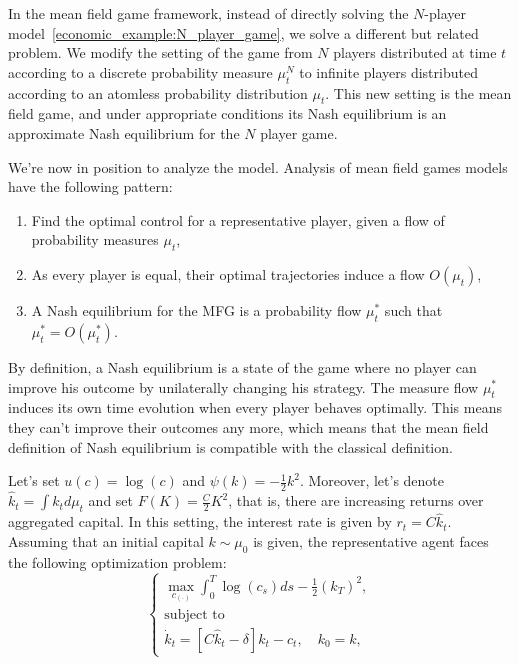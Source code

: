 In the mean field game framework, instead of directly solving the $N$-player model~\eqref{economic_example:N_player_game},
we solve a different but related problem. 
We modify the setting of the game from $N$ players distributed at time $t$ according to a discrete probability measure $\mu^N_t$ to infinite players
distributed according to an atomless probability distribution  $\mu_t$.
This new setting is the mean field game, and under appropriate conditions its Nash equilibrium is an approximate Nash equilibrium for the $N$ player game.

We're now in position to analyze the model. Analysis of mean field games models have the following pattern:
\begin{enumerate}
    \item Find the optimal control for a representative player, given a flow of probability measures $\mu_t$,
    \item As every player is equal, their optimal trajectories induce a flow $O(\mu_t)$,
    \item A Nash equilibrium for the MFG is a probability flow $\mu_t^*$ such that $\mu_t^* = O(\mu_t^*)$.
\end{enumerate}
By definition, a Nash equilibrium is a state of the game where no player can improve his outcome by unilaterally changing his strategy.
The measure flow $\mu_t^*$ induces its own time evolution when every player behaves optimally.
This means they can't improve their outcomes any more,
which means that the mean field definition of Nash equilibrium is compatible with the classical definition.
 
Let's set $u(c) = \log(c)$ and $\psi(k) = - \frac{1}{2} k^2$.
Moreover, let's denote $\hat k_t = \int k_t d \mu_t$ and set $F(K) = \frac{C}{2} K^2$, that is, there are increasing returns over aggregated capital.
In this setting, the interest rate is given by $r_t = C {\hat k_t} $.
Assuming that an initial capital $k \sim \mu_0$ is given,
the representative agent faces the following optimization problem:
\begin{equation}\label{economic_example:representative_agent}
    \begin{cases}
        \max_{c_{(\cdot)}} \int_0^T \log(c_s) ds -\frac{1}{2}{(k_T)}^2,\\
        \text{subject to}\\
        \dot k_t = \left[ C {\hat k_t} - \delta \right] k_t - c_t, \quad k_0 = k,
    \end{cases}
\end{equation}

